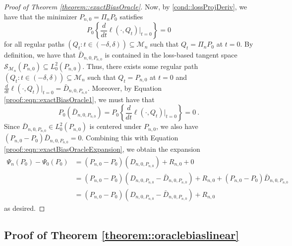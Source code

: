 \documentclass[11pt]{article}
\theoremstyle{definition}
\begin{document}
\begin{proof}[Proof of Theorem \ref{theorem::exactBiasOracle}]
Now, by  \ref{cond::lossProjDeriv}, we have that the minimizer $P_{n,0} = \Pi_n P_0$ satisfies
\begin{equation}
     P_0  \left\{\frac{d}{dt} \ell(\cdot,Q_t) \big|_{t=0} \right\}= 0
     \label{proof::eqn::exactBiasOracle1}
\end{equation}
for all regular paths $(Q_t: t \in (-\delta, \delta)) \subseteq \mathcal{M}_n$ such that $Q_t = \Pi_n P_0$ at $t=0$. By definition, we have that $ \bar{D}_{n, 0,P_{n,0}}$ is contained in the loss-based tangent space $\mathcal{S}_{\mathcal{M}_n}(P_{n,0}) \subseteq L^2_0(P_{n,0})$. Thus, there exists some regular path $(Q_t: t \in (-\delta, \delta)) \subseteq \mathcal{M}_n$ such that $Q_t = P_{n,0}$ at $t=0$ and $\frac{d}{dt} \ell(\cdot,Q_t) \big|_{t=0} =  \bar{D}_{n, 0,P_{n,0}}$. Moreover, by Equation \eqref{proof::eqn::exactBiasOracle1}, we must have that
$$P_0 ( \bar{D}_{n, 0,P_{n,0}} ) = P_0 \left\{ \frac{d}{dt} \ell(\cdot,Q_t) \big|_{t=0}\right\}  = 0\ .$$
Since $\bar{D}_{n, 0,P_{n,0}} \in L^2_0(P_{n,0})$ is centered under $P_{n,0}$, we also have $(P_{n,0} - P_0) \bar{D}_{n, 0,P_{n,0}} = 0$. Combining this with Equation \eqref{proof::eqn::exactBiasOracleExpansion}, we obtain the expansion
\begin{align*}
        \Psi_n(P_0) - \Psi_0(P_0) &=  (P_{n,0}- P_0) ( D_{n, 0,P_{n,0}} ) +  R_{n,0} + 0 \\
        &=  (P_{n,0}- P_0) ( D_{n, 0,P_{n,0}} - \bar{D}_{n, 0,P_{n,0}} ) + R_{n,0} + (P_{n,0} - P_0) \bar{D}_{n, 0,P_{n,0}} \\
        &=  (P_{n,0}- P_0) ( D_{n, 0,P_{n,0}} - \bar{D}_{n, 0,P_{n,0}} ) + R_{n,0}
\end{align*}
as desired.
\end{proof}
 


\subsection{Proof of Theorem \ref{theorem::oraclebiaslinear}}
\end{document}
